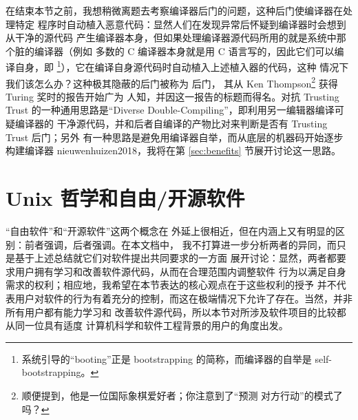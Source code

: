 在结束本节之前，我想稍微离题去考察编译器后门的问题，这种后门使编译器在处理特定
程序时自动植入恶意代码：显然人们在发现异常后怀疑到编译器时会想到从干净的源代码
产生编译器本身，但如果处理编译器源代码所用的就是系统中那个脏的编译器（例如
多数的 C 编译器本身就是用 C 语言写的，因此它们可以编译自身，即%
\footnote{系统引导的“booting”正是 bootstrapping 的简称，而编译器的自举是
self-bootstrapping。}），它在编译自身源代码时自动植入上述植入器的代码，这种
情况下我们该怎么办？这种极其隐蔽的后门被称为  后门，
其从 Ken Thompson\footnote{顺便提到，他是一位国际象棋爱好者；你注意到了“预测
对方行动”的模式了吗？} 获得 Turing 奖时的报告开始广为
人知，并因这一报告的标题而得名。对抗 Trusting Trust 的一种通用思路是“Diverse
Double-Compiling”，即利用另一编辑器编译可疑编译器的
干净源代码，并和后者自编译的产物比对来判断是否有 Trusting Trust 后门；另外
有一种思路是避免用编译器自举，而从底层的机器码开始逐步构建编译器\cupercite%
{nieuwenhuizen2018}，我将在第 \ref{sec:benefits} 节展开讨论这一思路。

\section{Unix 哲学和自由/开源软件}\label{sec:foss}

“自由软件”和“开源软件”这两个概念在
外延上很相近，但在内涵上又有明显的区别：前者强调，后者强调。在本文档中，
我不打算进一步分析两者的异同，而只是基于上述总结就它们对软件提出共同要求的一方面
展开讨论：显然，两者都要求用户拥有学习和改善软件源代码，从而在合理范围内调整软件
行为以满足自身需求的权利；相应地，我希望在本节表达的核心观点在于这些权利的授予
并不代表用户对软件的行为有着充分的控制，而这在极端情况下允许了存在。当然，并非所有用户都有能力学习和
改善软件源代码，所以本节对所涉及软件项目的比较都从同一位具有适度
计算机科学和软件工程背景的用户的角度出发。

